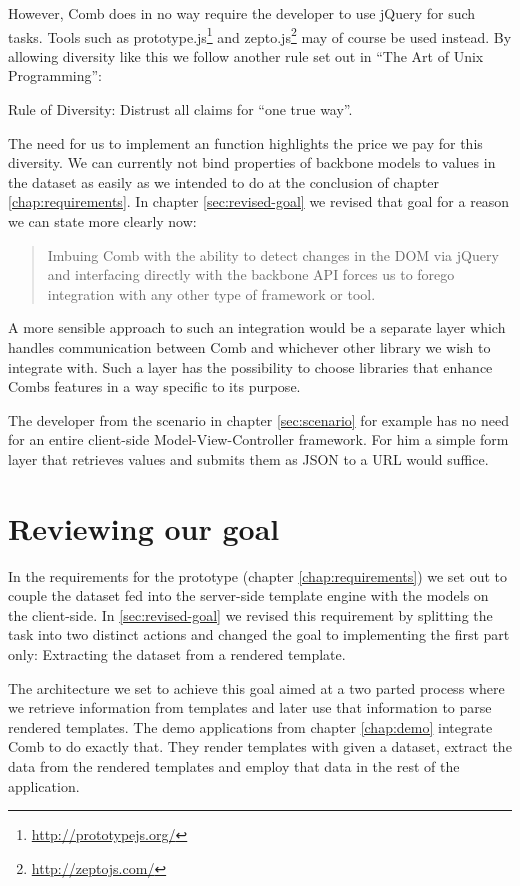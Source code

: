 \documentclass[thesis.tex]{subfiles}
\begin{document}
However, Comb does in no way require the developer to use jQuery for such tasks.
Tools such as prototype.js\footnote{\url{http://prototypejs.org/}} and
zepto.js\footnote{\url{http://zeptojs.com/}} may of course be used instead.
By allowing diversity like this we follow another rule set out in
``The Art of Unix Programming'':
\begin{citequote}{\cite[Chapter 1]{UXART}}
Rule of Diversity: Distrust all claims for ``one true way''.
\end{citequote}

The need for us to implement an  function highlights the
price we pay for this diversity. We can currently not bind properties of
backbone models to values in the dataset as easily as we intended to do at the
conclusion of chapter \ref{chap:requirements}. In chapter \ref{sec:revised-goal}
we revised that goal for a reason we can state more clearly now:
\begin{quote}
Imbuing Comb with the ability to detect changes in the DOM via jQuery and
interfacing directly with the backbone API forces us to forego integration with
any other type of framework or tool.
\end{quote}
A more sensible approach to such an integration would be a separate layer which
handles communication between Comb and whichever other library we wish to
integrate with. Such a layer has the possibility to choose libraries that
enhance Combs features in a way specific to its purpose.

The developer from the scenario in chapter \ref{sec:scenario} for example has
no need for an entire client-side Model-View-Controller framework.
For him a simple form layer that retrieves values and submits them as JSON to a
URL would suffice.





\section{Reviewing our goal}
In the requirements for the prototype (chapter \ref{chap:requirements})
we set out to couple the dataset fed into the server-side template engine with
the models on the client-side. In \ref{sec:revised-goal} we revised this
requirement by splitting the task into two distinct actions and changed the goal
to implementing the first part only: Extracting the dataset from a rendered
template.

The architecture we set to achieve this goal aimed at a two parted process where
we retrieve information from templates and later use that information to parse
rendered templates. The demo applications from chapter \ref{chap:demo}
integrate Comb to do exactly that. They render templates with given a dataset,
extract the data from the rendered templates and employ that data in the rest of
the application.
\end{document}
